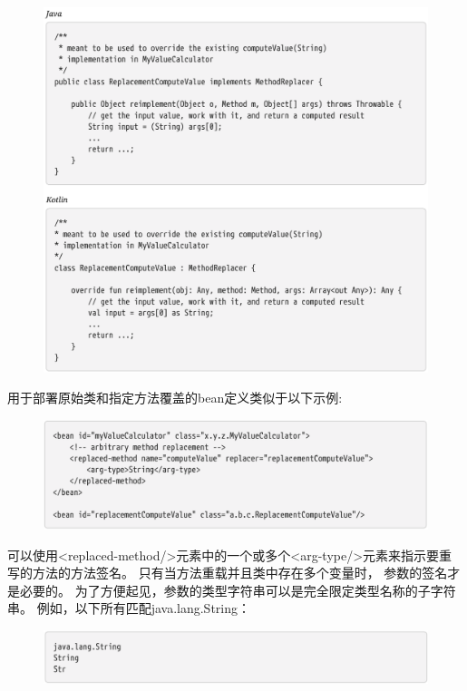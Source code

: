 \begin{figure}[ht]
    \centering
    \includegraphics[width=1\linewidth]{./Figure/70.png}
\end{figure}

\newpage
用于部署原始类和指定方法覆盖的bean定义类似于以下示例:

\begin{figure}[ht]
    \centering
    \includegraphics[width=1\linewidth]{./Figure/71.png}
\end{figure}




可以使用<replaced-method/>元素中的一个或多个<arg-type/>元素来指示要重写的方法的方法签名。
只有当方法重载并且类中存在多个变量时，
参数的签名才是必要的。
为了方便起见，参数的类型字符串可以是完全限定类型名称的子字符串。
例如，以下所有匹配java.lang.String：

\begin{figure}[ht]
    \centering
    \includegraphics[width=1\linewidth]{./Figure/72.png}
\end{figure}

